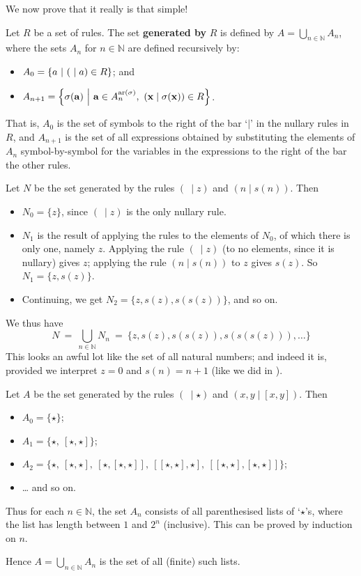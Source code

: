 We now prove that it really is that simple!

\begin{definition}
\label{defSetGeneratedByRules}
Let $R$ be a set of rules. The set \textbf{generated by} $R$ is defined by $A = \bigcup_{n \in \mathbb{N}} A_n$, where the sets $A_n$ for $n \in \mathbb{N}$ are defined recursively by:
\begin{itemize}
\item $A_0 = \left\{ a ~\middle|~ (~\mid a) \in R \right\}$; and
\item $A_{n+1} = \left\{ \sigma(\mathbf{a}) ~\middle|~ \mathbf{a} \in A_n^{\mathrm{ar}(\sigma)},~ (\mathbf{x} \mid \sigma(\mathbf{x})) \in R \right\}$.
\end{itemize}
That is, $A_0$ is the set of symbols to the right of the bar `$\mid$' in the nullary rules in $R$, and $A_{n+1}$ is the set of all expressions obtained by substituting the elements of $A_n$ symbol-by-symbol for the variables in the expressions to the right of the bar the other rules.
\end{definition}

\begin{example}
Let $N$ be the set generated by the rules $(~ \mid z)$ and $(n \mid s(n))$. Then
\begin{itemize}
\item $N_0 = \{ z \}$, since $(~ \mid z)$ is the only nullary rule.
\item $N_1$ is the result of applying the rules to the elements of $N_0$, of which there is only one, namely $z$. Applying the rule $(~\mid z)$ (to no elements, since it is nullary) gives $z$; applying the rule $(n \mid s(n))$ to $z$ gives $s(z)$. So $N_1 = \{ z, s(z) \}$.
\item Continuing, we get $N_2 = \{ z, s(z), s(s(z)) \}$, and so on.
\end{itemize}
We thus have
\[ N ~=~ \bigcup_{n \in \mathbb{N}} N_n ~=~ \{ z, s(z), s(s(z)), s(s(s(z))), \dots \} \]
This looks an awful lot like the set of all natural numbers; and indeed it is, provided we interpret $z=0$ and $s(n)=n+1$ (like we did in ).
\end{example}

\begin{example}
\label{exParenthesisations}
Let $A$ be the set generated by the rules $(~ \mid \star)$ and $(x,y \mid [x,y])$. Then
\begin{itemize}
\item $A_0 = \{ \star \}$;
\item $A_1 = \{ \star,~ [\star, \star] \}$;
\item $A_2 = \{ \star,~ [\star, \star],~ [\star, [\star,\star]],~ [[\star, \star], \star],~ [[\star,\star],[\star,\star]] \}$;
\item \dots{} and so on.
\end{itemize}
Thus for each $n \in \mathbb{N}$, the set $A_n$ consists of all parenthesised lists of `$\star$'s, where the list has length between $1$ and $2^n$ (inclusive). This can be proved by induction on $n$.

Hence $A = \bigcup_{n \in \mathbb{N}} A_n$ is the set of all (finite) such lists.
\end{example}

